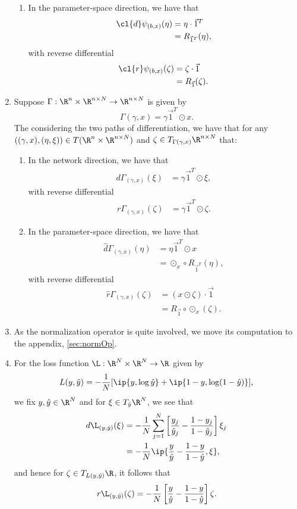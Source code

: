 \begin{enumerate}
\begin{enumerate}
		\item In the parameter-space direction, we have that
		\begin{align*}
			\cl{d}\psi_{(b,x)}(\eta)&=\eta\cdot\vec{1}^T\\
			&=R_{\vec{1}^T}(\eta),
		\end{align*}
		with reverse differential
		\begin{align*}
			\cl{r}\psi_{(b,x)}(\zeta)&=\zeta\cdot\vec{1}\\
			&=R_{\vec{1}}(\zeta).
		\end{align*}
	\end{enumerate}
	
	\item Suppose $\Gamma:\R^n\times\R^{n\times N}\to\R^{n\times N}$ is given by
	$$\Gamma(\gamma,x)=\gamma\vec{1}^T\odot x.$$
	The considering the two paths of differentiation, we have that for any $((\gamma,x), (\eta,\xi))\in T(\R^n\times\R^{n\times N})$ and $\zeta\in T_{\Gamma(\gamma,x)}\R^{n\times N}$ that:
	\begin{enumerate}
		\item In the network direction, we have that
		\begin{align*}
			d\Gamma_{(\gamma,x)}(\xi)&=\gamma\vec{1}^T\odot\xi,
		\end{align*}
		with reverse differential
		\begin{align*}
			r\Gamma_{(\gamma,x)}(\zeta)&=\gamma\vec{1}^T\odot\zeta.
		\end{align*}
		
		\item In the parameter-space direction, we have that
		\begin{align*}
			\hat{d}\Gamma_{(\gamma,x)}(\eta)&=\eta\vec{1}^T\odot x\\
			&=\odot_x\circ R_{\vec{1}^T}(\eta),
		\end{align*}
		with reverse differential
		\begin{align*}
			\hat{r}\Gamma_{(\gamma,x)}(\zeta)&=(x\odot\zeta)\cdot\vec{1}\\
			&=R_{\vec{1}}\circ\odot_x(\zeta).
		\end{align*}
	\end{enumerate}
	
	\item As the normalization operator is quite involved, we move its computation to the appendix, \cref{sec:normOp}.
	
	\item For the loss function $\L:\R^N\times\R^N\to\R$ given by
	$$L(y,\hat{y})=-\frac{1}{N}[\ip{y,\log{\hat{y}}}+\ip{1-y,\log(1-\hat{y})}],$$
	we fix $y,\hat{y}\in\R^N$ and for $\xi\in T_{\hat{y}}\R^N$, we see that
	\begin{align*}
		d\L_{(y,\hat{y})}(\xi)&=-\frac{1}{N}\sum_{j=1}^N\left[\frac{y_j}{\hat{y}_j}-\frac{1-y_j}{1-\hat{y}_j}\right]\xi_j\\
		&=-\frac{1}{N}\ip{\frac{y}{\hat{y}}-\frac{1-y}{1-\hat{y}},\xi},
	\end{align*}
	and hence for $\zeta\in T_{L(y,\hat{y})}\R$, it follows that
	$$r\L_{(y,\hat{y})}(\zeta)=-\frac{1}{N}\left[\frac{y}{\hat{y}}-\frac{1-y}{1-\hat{y}}\right]\zeta.$$
	

\end{enumerate}
